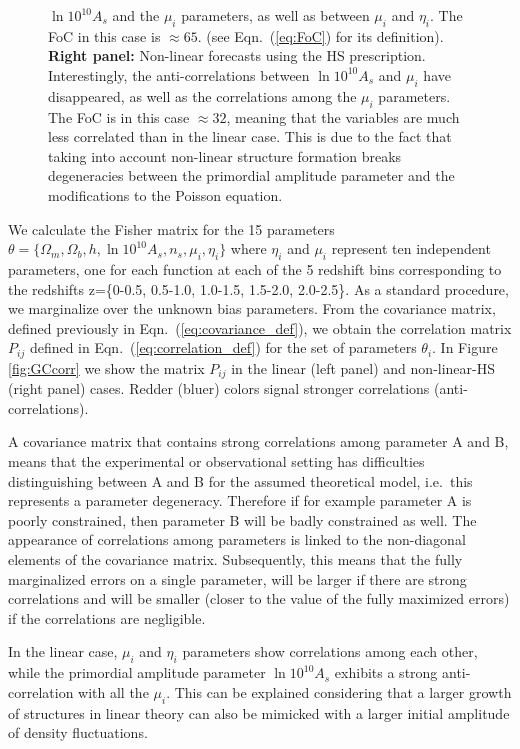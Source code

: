 \begin{figure}[H]
{ $\ln10^{10}A_{s}$  and the $\mu_i$ parameters, as well as between $\mu_i$ and $\eta_i$. The FoC in this case is $\approx 65$. (see Eqn.\ (\ref{eq:FoC}) for its definition).
\textbf{Right panel: } Non-linear 
forecasts using the HS prescription. Interestingly, the anti-correlations between  $\ln10^{10}A_{s}$  and $\mu_i$ 
have disappeared, as well as the correlations among the  $\mu_i$ parameters. The FoC is in this case   $\approx 32$, meaning that the variables are much less correlated than in the linear case.
This is due to the fact that taking into account non-linear structure formation breaks degeneracies between the primordial amplitude parameter and the modifications
to the Poisson equation.}
\end{figure}


We calculate the Fisher matrix for the 15 parameters
$\theta=\{\Omega_{m},\Omega_{b},h,\ln10^{10}A_{s},n_{s},\mu_{i},\eta_{i}\}$
where $\eta_{i}$ and $\mu_{i}$ represent ten independent parameters, one for each function
at each of the 5 redshift bins corresponding to the redshifts z=\{0-0.5, 0.5-1.0, 1.0-1.5, 1.5-2.0, 2.0-2.5\}. As a standard procedure, we marginalize over the unknown bias parameters.
From the covariance matrix, defined
previously in Eqn.\ (\ref{eq:covariance_def}), we obtain the correlation
matrix $P_{ij}$ defined in Eqn.\ (\ref{eq:correlation_def}) for the
set of parameters $\theta_{i}$. In Figure \ref{fig:GCcorr} we show
the matrix $P_{ij}$ in the linear (left panel) and non-linear-HS
(right panel) cases. Redder (bluer) colors signal stronger correlations
(anti-correlations). 

A covariance matrix that contains strong correlations among parameter A and B, means that the 
experimental or observational setting has difficulties distinguishing between A and B for the assumed theoretical model, i.e.\ this represents a parameter degeneracy.
Therefore if for example parameter A is poorly constrained, then parameter B will be badly constrained as well.
The appearance of correlations among parameters is linked to the non-diagonal elements of the covariance matrix. Subsequently, this means that
the fully marginalized errors on a single parameter, will be larger if there are strong correlations and will be smaller (closer to the value of the
fully maximized errors) if the correlations are negligible.

In the linear case, $\mu_{i}$ and $\eta_{i}$ parameters show correlations
among each other, while the primordial
 amplitude parameter $\ln10^{10}A_{s}$ exhibits a strong anti-correlation with all the $\mu_{i}$.
This can be explained considering that a larger growth of
structures in linear theory can also be mimicked with a larger initial
amplitude of density fluctuations.

